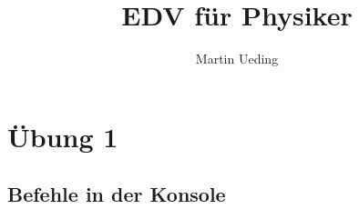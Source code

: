 \documentclass[12pt]{article}
\title{EDV für Physiker}
\author{Martin Ueding}
\begin{document}
\maketitle

\tableofcontents
\newpage



\section{Übung 1}

\subsection{Befehle in der Konsole}
\label{commands}
\end{document}
